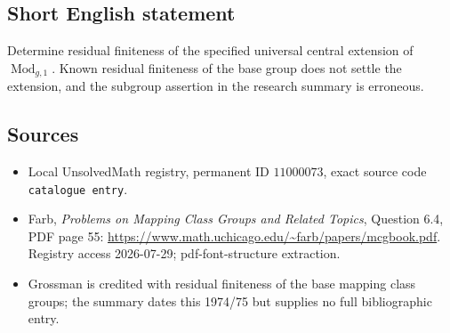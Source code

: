 \documentclass[11pt]{article}
\begin{document}
\subsection{Short English statement}
Determine residual finiteness of the specified universal central extension of \(\operatorname{Mod}_{g,1}\). Known residual finiteness of the base group does not settle the extension, and the subgroup assertion in the research summary is erroneous.
\subsection{Sources}
\begin{itemize}
\item Local UnsolvedMath registry, permanent ID \(11000073\), exact source code \texttt{catalogue entry}.
\item Farb, \emph{Problems on Mapping Class Groups and Related Topics}, Question 6.4, PDF page 55: \url{https://www.math.uchicago.edu/~farb/papers/mcgbook.pdf}. Registry access 2026-07-29; pdf-font-structure extraction.
\item Grossman is credited with residual finiteness of the base mapping class groups; the summary dates this 1974/75 but supplies no full bibliographic entry.
\end{itemize}
\end{document}
